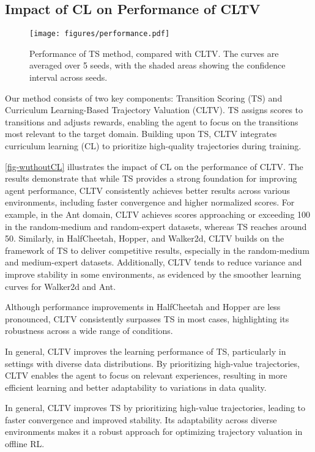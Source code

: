 



\subsection{Impact of CL on Performance of CLTV}
\begin{figure}[!ht]
\center
\texttt{[image: figures/performance.pdf]}
\caption{Performance of TS method, compared with CLTV. The curves are averaged over 5 seeds, with the shaded areas showing the confidence interval across seeds.}
\label{fig-wuthoutCL}
\end{figure}



Our method consists of two key components: Transition Scoring (TS) and Curriculum Learning-Based Trajectory Valuation (CLTV). TS assigns scores to transitions and adjusts rewards, enabling the agent to focus on the transitions most relevant to the target domain. Building upon TS, CLTV integrates curriculum learning (CL) to prioritize high-quality trajectories during training.

\autoref{fig-wuthoutCL} illustrates the impact of CL on the performance of CLTV. The results demonstrate that while TS provides a strong foundation for improving agent performance, CLTV consistently achieves better results across various environments, including faster convergence and higher normalized scores. For example, in the Ant domain, CLTV achieves scores approaching or exceeding 100 in the random-medium and random-expert datasets, whereas TS reaches around 50. Similarly, in HalfCheetah, Hopper, and Walker2d, CLTV builds on the framework of TS to deliver competitive results, especially in the random-medium and medium-expert datasets. Additionally, CLTV tends to reduce variance and improve stability in some environments, as evidenced by the smoother learning curves for Walker2d and Ant.


Although performance improvements in HalfCheetah and Hopper are less pronounced, CLTV consistently surpasses TS in most cases, highlighting its robustness across a wide range of conditions.

In general, CLTV improves the learning performance of TS, particularly in settings with diverse data distributions. By prioritizing high-value trajectories, CLTV enables the agent to focus on relevant experiences, resulting in more efficient learning and better adaptability to variations in data quality.


In general, CLTV improves TS by prioritizing high-value trajectories, leading to faster convergence and improved stability. Its adaptability across diverse environments makes it a robust approach for optimizing trajectory valuation in offline RL.
